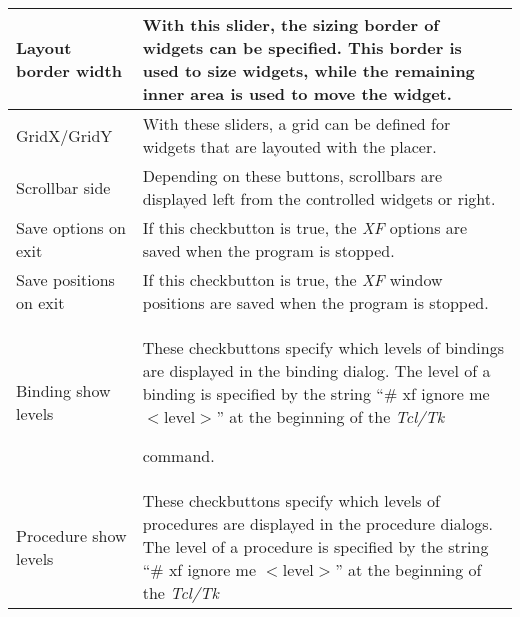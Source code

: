 {\begin{supertabular}{|l|p{6.5cm}|}
Layout border width          & With this slider, the sizing
                               border of widgets can be
                               specified. This border is
                               used to size widgets, while
                               the remaining inner area is
                               used to move the widget.\\  \hline
GridX/GridY                  & With these sliders, a grid
                               can be defined for widgets
                               that are layouted with the
                               placer.\\  \hline
Scrollbar side               & Depending on these buttons,
                               scrollbars are displayed left
                               from the controlled widgets
                               or right.\\  \hline
Save options on exit         & If this checkbutton is true,
                               the {\em XF }
 options are saved
                               when the program is stopped.\\  \hline
Save positions on exit       & If this checkbutton is true,
                               the {\em XF }
 window positions are
                               saved when the program is
                               stopped.\\  \hline
Binding show levels          & These checkbuttons specify
                               which levels of bindings are
                               displayed in the binding
                               dialog. The level of a
                               binding is specified by the
                               string ``\# xf ignore me
                               $<$level$>$'' at the
                               beginning of the {\em Tcl/Tk }

                               command.\\  \hline
Procedure show levels        & These checkbuttons specify
                               which levels of procedures
                               are displayed in the
                               procedure dialogs. The level
                               of a procedure is specified
                               by the string ``\# xf ignore
                               me $<$level$>$'' at the
                               beginning of the {\em Tcl/Tk }


\end{supertabular}}
